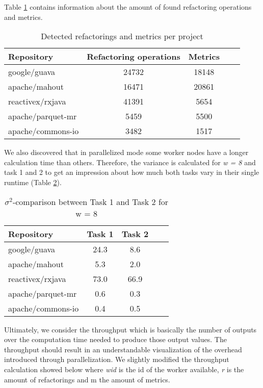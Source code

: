 Table \ref{tab:detectedrefandmetrics} contains information about the amount of found refactoring operations and metrics. 

\begin{table}[ht]
\caption{Detected refactorings and metrics per project}
\label{tab:detectedrefandmetrics}
\begin{center}
\begin{tabular}{|l|c|c|c|c|}
\hline
\textbf{Repository}&\textbf{Refactoring operations}&\textbf{Metrics}\\
\hline
google/guava& 24732 & 18148\\
\hline
apache/mahout& 16471 & 20861\\
\hline
reactivex/rxjava& 41391 & 5654\\
\hline
apache/parquet-mr & 5459 & 5500\\
\hline
apache/commons-io & 3482 & 1517\\
\hline
\end{tabular}
\end{center}
\end{table}

We also discovered that in parallelized mode some worker nodes have a longer calculation time than others. Therefore, the variance is calculated for \emph{w = 8} and task 1 and 2 to get an impression about how much both tasks vary in their single runtime (Table \ref{tab:variance}).

\begin{table}[ht]
\caption{$\sigma^2$-comparison between Task 1 and Task 2 for w = 8}
\label{tab:variance}
\begin{center}
\begin{tabular}{|l|c|c|c|c|}
\hline
\textbf{Repository}&  \textbf{Task 1}&\textbf{Task 2}\\
\hline
google/guava& 24.3 & 8.6\\
\hline
apache/mahout& 5.3 & 2.0\\
\hline
reactivex/rxjava& 73.0 & 66.9\\
\hline
apache/parquet-mr& 0.6 & 0.3\\
\hline
apache/commons-io& 0.4 & 0.5\\
\hline
\end{tabular}
\end{center}
\end{table}

Ultimately, we consider the throughput which is basically the number of outputs over the computation time needed to produce those output values. The throughput should result in an understandable visualization of the overhead introduced through parallelization. We slightly modified the throughput calculation showed below where \emph{wid} is the id of the worker available, \emph{r} is the amount of refactorings and m the amount of metrics.

